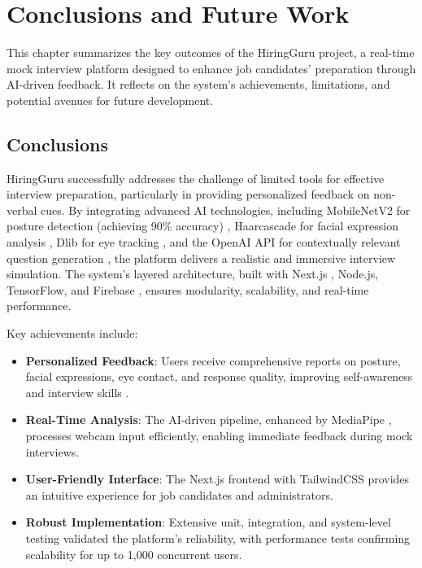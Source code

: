 \chapter{Conclusions and Future Work}
\label{ch:conclusions}

This chapter summarizes the key outcomes of the HiringGuru project, a real-time mock interview platform designed to enhance job candidates’ preparation through AI-driven feedback. It reflects on the system’s achievements, limitations, and potential avenues for future development.

\section{Conclusions}
HiringGuru successfully addresses the challenge of limited tools for effective interview preparation, particularly in providing personalized feedback on non-verbal cues. By integrating advanced AI technologies, including MobileNetV2 for posture detection (achieving 90\% accuracy) \cite{howard2018mobilenetv2}, Haarcascade for facial expression analysis \cite{viola2001haar}, Dlib for eye tracking \cite{king2009dlib}, and the OpenAI API for contextually relevant question generation \cite{openai2023api}, the platform delivers a realistic and immersive interview simulation. The system’s layered architecture, built with Next.js \cite{vercel2023nextjs}, Node.js, TensorFlow, and Firebase \cite{firebase2023docs}, ensures modularity, scalability, and real-time performance.

Key achievements include:
\begin{itemize}
    \item \textbf{Personalized Feedback}: Users receive comprehensive reports on posture, facial expressions, eye contact, and response quality, improving self-awareness and interview skills \cite{hufford2020interview}.
    \item \textbf{Real-Time Analysis}: The AI-driven pipeline, enhanced by MediaPipe \cite{lugaresi2019mediapipe}, processes webcam input efficiently, enabling immediate feedback during mock interviews.
    \item \textbf{User-Friendly Interface}: The Next.js frontend with TailwindCSS provides an intuitive experience for job candidates and administrators.
    \item \textbf{Robust Implementation}: Extensive unit, integration, and system-level testing validated the platform’s reliability, with performance tests confirming scalability for up to 1,000 concurrent users.
\end{itemize}

